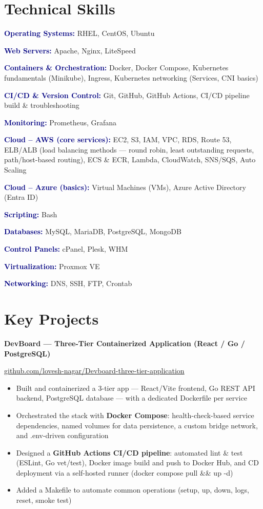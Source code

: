 \documentclass[11pt,a4paper]{article}
\newcommand{\role}[2]{%
  \noindent\textbf{#1}\hfill\textit{\textcolor{midgray}{#2}}\par\vspace{1pt}
}
\newcommand{\skillrow}[2]{%
  \noindent\textbf{\textcolor{navy}{#1:}} #2\par\vspace{5pt}
}
\begin{document}
\section*{Technical Skills}
\small
\skillrow{Operating Systems}{RHEL, CentOS, Ubuntu}
\skillrow{Web Servers}{Apache, Nginx, LiteSpeed}
\skillrow{Containers \& Orchestration}{Docker, Docker Compose, Kubernetes fundamentals (Minikube), Ingress, Kubernetes networking (Services, CNI basics)}
\skillrow{CI/CD \& Version Control}{Git, GitHub, GitHub Actions, CI/CD pipeline build \& troubleshooting}
\skillrow{Monitoring}{Prometheus, Grafana}
\skillrow{Cloud -- AWS (core services)}{EC2, S3, IAM, VPC, RDS, Route 53, ELB/ALB (load balancing methods --- round robin, least outstanding requests, path/host-based routing), ECS \& ECR, Lambda, CloudWatch, SNS/SQS, Auto Scaling}
\skillrow{Cloud -- Azure (basics)}{Virtual Machines (VMs), Azure Active Directory (Entra ID)}
\skillrow{Scripting}{Bash}
\skillrow{Databases}{MySQL, MariaDB, PostgreSQL, MongoDB}
\skillrow{Control Panels}{cPanel, Plesk, WHM}
\skillrow{Virtualization}{Proxmox VE}
\skillrow{Networking}{DNS, SSH, FTP, Crontab}

\section*{Key Projects}
\small

\role{DevBoard --- Three-Tier Containerized Application (React / Go / PostgreSQL)}{}
\href{https://github.com/lovesh-nagar/Devboard-three-tier-application}{github.com/lovesh-nagar/Devboard-three-tier-application}
\begin{itemize}
  \item Built and containerized a 3-tier app --- React/Vite frontend, Go REST API backend, PostgreSQL database --- with a dedicated Dockerfile per service
  \item Orchestrated the stack with \textbf{Docker Compose}: health-check-based service dependencies, named volumes for data persistence, a custom bridge network, and .env-driven configuration
  \item Designed a \textbf{GitHub Actions CI/CD pipeline}: automated lint \& test (ESLint, Go vet/test), Docker image build and push to Docker Hub, and CD deployment via a self-hosted runner (docker compose pull \&\& up -d)
  \item Added a Makefile to automate common operations (setup, up, down, logs, reset, smoke test)
\end{itemize}
\end{document}
